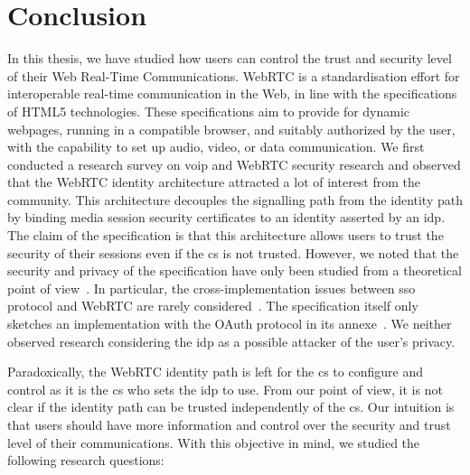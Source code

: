 \chapter{Conclusion}
\label{conclusion}

\glsresetall

In this thesis, we have studied how users can control the trust and security level of their Web Real-Time Communications.
WebRTC is a standardisation effort for interoperable real-time communication in the Web, in line with the specifications of HTML5 technologies.
These specifications aim to provide for dynamic webpages, running in a compatible browser, and suitably authorized by the user, with the capability to set up audio, video, or data communication.
We first conducted a research survey on \gls{voip} and WebRTC security research and observed that the WebRTC identity architecture attracted a lot of interest from the community.
This architecture decouples the signalling path from the identity path by binding media session security certificates to an identity asserted by an \gls{idp}.
The claim of the specification is that this architecture allows users to trust the security of their sessions even if the \gls{cs} is not trusted.
However, we noted that the security and privacy of the specification have only been studied from a theoretical point of view~\cite{de2016ensuring}. 
In particular, the cross-implementation issues between \gls{sso} protocol and WebRTC are rarely considered~\cite{li2014calling,de2016ensuring}. 
The specification itself only sketches an implementation with the OAuth protocol in its annexe~\cite{I-D.ietf-rtcweb-security-arch}. 
We neither observed research considering the \gls{idp} as a possible attacker of the user's privacy.

Paradoxically, the WebRTC identity path is left for the \gls{cs} to configure and control as it is the \gls{cs} who sets the \gls{idp} to use.
From our point of view, it is not clear if the identity path can be trusted independently of the \gls{cs}.
Our intuition is that users should have more information and control over the security and trust level of their communications.
With this objective in mind, we studied the following research questions:


